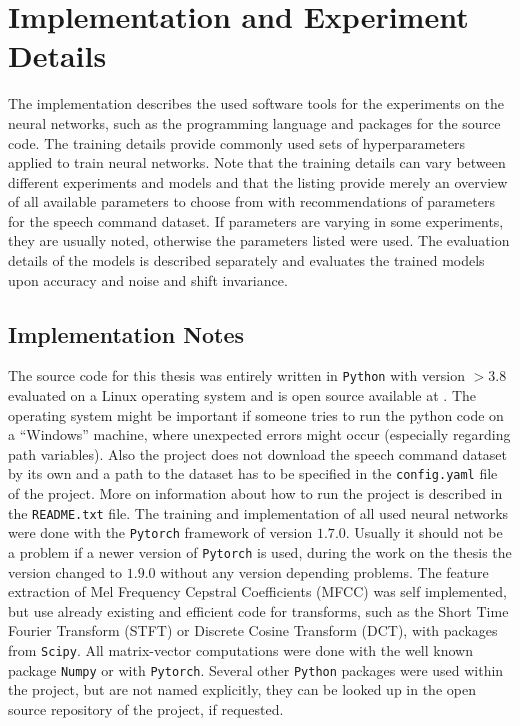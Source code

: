 
\section{Implementation and Experiment Details}\label{sec:exp_details}
\thesisStateReady
The implementation describes the used software tools for the experiments on the neural networks, such as the programming language and packages for the source code.
The training details provide commonly used sets of hyperparameters applied to train neural networks.
Note that the training details can vary between different experiments and models and that the listing provide merely an overview of all available parameters to choose from with recommendations of parameters for the speech command dataset.
If parameters are varying in some experiments, they are usually noted, otherwise the parameters listed were used.
The evaluation details of the models is described separately and evaluates the trained models upon accuracy and noise and shift invariance.



\subsection{Implementation Notes}\label{sec:exp_details_implementation}
The source code for this thesis was entirely written in \texttt{Python} with version $>3.8$ evaluated on a Linux operating system and is open source available at \cite{KWSGame}.
The operating system might be important if someone tries to run the python code on a \enquote{Windows} machine, where unexpected errors might occur (especially regarding path variables).
Also the project does not download the speech command dataset by its own and a path to the dataset has to be specified in the \texttt{config.yaml} file of the project.
More on information about how to run the project is described in the \texttt{README.txt} file.
The training and implementation of all used neural networks were done with the \texttt{Pytorch} \cite{Pytorch} framework of version $1.7.0$. 
Usually it should not be a problem if a newer version of \texttt{Pytorch} is used, during the work on the thesis the version changed to $1.9.0$ without any version depending problems.
The feature extraction of Mel Frequency Cepstral Coefficients (MFCC) was self implemented, but use already existing and efficient code for transforms, such as the Short Time Fourier Transform (STFT) or Discrete Cosine Transform (DCT), with packages from \texttt{Scipy}.
All matrix-vector computations were done with the well known package \texttt{Numpy} or with \texttt{Pytorch}.
Several other \texttt{Python} packages were used within the project, but are not named explicitly, they can be looked up in the open source repository of the project, if requested.


